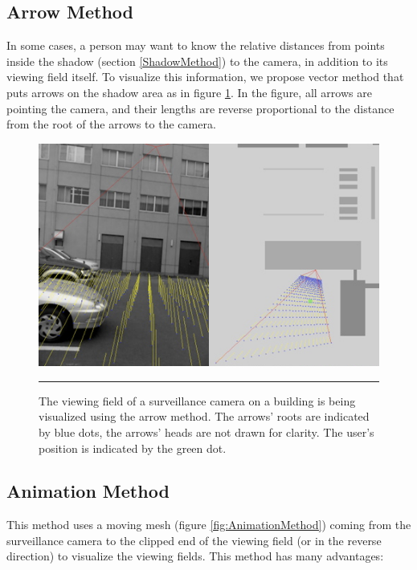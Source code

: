 \subsection{Arrow Method}

In some cases, a person may want to know the relative distances from points inside the shadow (section \ref{ShadowMethod}) to the camera, in addition to its viewing field itself. To visualize this information, we propose vector method that puts arrows on the shadow area as in figure \ref{fig:ArrowMethod}. In the figure, all arrows are pointing the camera, and their lengths are reverse proportional to the distance from the root of the arrows to the camera.

\begin{figure}[htbp]
	\centering
	\includegraphics[width=14cm]{./Primitives/theory_arrow.png}
	\rule{35em}{0.5pt}
	\caption[Arrow method]{The viewing field of a surveillance camera on a building is being visualized using the arrow method. The arrows' roots are indicated by blue dots, the arrows' heads are not drawn for clarity. The user's position is indicated by the green dot.}
	\label{fig:ArrowMethod}
\end{figure}

\subsection{Animation Method}

This method uses a moving mesh (figure \ref{fig:AnimationMethod}) coming from the surveillance camera to the clipped end of the viewing field (or in the reverse direction) to visualize the viewing fields. This method has  many advantages:

